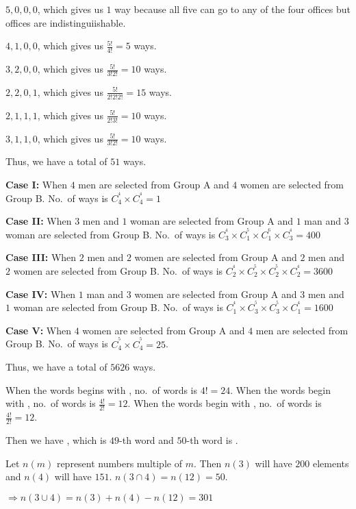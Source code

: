   $5, 0, 0, 0$, which gives us $1$ way because all five can go to any of the four offices but offices are
  indistinguiishable.

  $4, 1, 0, 0$, which gives us $\frac{5!}{4!} = 5$ ways.

  $3, 2, 0, 0$, which gives us $\frac{5!}{3!2!} = 10$ ways.

  $2, 2, 0, 1$, which gives us $\frac{5!}{2!2!2!} = 15$ ways.

  $2, 1, 1, 1$, which gives us $\frac{5!}{2!3!} = 10$ ways.

  $3, 1, 1, 0$, which gives us $\frac{5!}{3!2!} = 10$ ways.

  Thus, we have a total of $51$ ways.
\item {\bf Case I:} When $4$ men are selected from Group A and $4$ women are selected from Group B. No.\ of
  ways is $C_4^^4\times C_4^^4 = 1$

  {\bf Case II:} When $3$ men and $1$ woman are selected from Group A and $1$ man and $3$ woman are selected
  from Group B. No.\ of ways is $C_3^^4\times C_1^^5\times C_1^^6\times C_3^^4 = 400$

  {\bf Case III:} When $2$ men and $2$ women are selected from Group A and $2$ men and $2$ women are
  selected from Group B. No.\ of ways is $C_2^^4\times C_2^^5\times C_2^^5\times C_2^^4 = 3600$

  {\bf Case IV:} When $1$ man and $3$ women are selected from Group A and $3$ men and $1$ woman are selected
  from Group B. No.\ of ways is $C_1^^4\times C_3^^5\times C_3^^5\times C_1^^4 = 1600$

  {\bf Case V:} When $4$ women are selected from Group A and $4$ men are selected from Group B. No.\ of ways
  is $C_4^^5\times C_4^^5 = 25$.

  Thus, we have a total of $5626$ ways.
\item When the words begins with , no.\ of words is $4! = 24$. When the words begin with ,
  no.\ of words is $\frac{4!}{2!} = 12$. When the words begin with , no.\ of words is
  $\frac{4!}{2!} = 12$.

  Then we have , which is $49$-th word and $50$-th word is .
\item Let $n(m)$ represent numbers multiple of $m$. Then $n(3)$ will have $200$ elements and $n(4)$ will
  have $151$. $n(3\cap 4) = n(12) = 50$.

  $\Rightarrow n(3\cup 4) = n(3) + n(4) - n(12) = 301$

